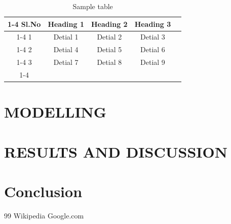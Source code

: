 \documentclass[12pt,a4paper]{report}
\begin{document}
\begin{table}[h]
\begin{center}
    

\begin{tabular}{|c|c|c|c|l}
\cline{1-4}
\textbf{Sl.No} & \textbf{Heading 1} & \textbf{Heading 2} & \textbf{Heading 3} &  \\ \cline{1-4}
1              & Detial 1           & Detial 2           & Detial 3           &  \\ \cline{1-4}
2              & Detial 4           & Detial 5           & Detial 6           &  \\ \cline{1-4}
3              & Detial 7           & Detial 8           & Detial 9           &  \\ \cline{1-4}
\end{tabular}
\caption{Sample table}
\label{tab:table1}
\end{center}
\end{table}

\chapter{MODELLING}
\chapter{RESULTS AND DISCUSSION}
\chapter{Conclusion}




\begin{thebibliography}{99}
 Wikipedia
 Google.com
\end{thebibliography}
\end{document}
